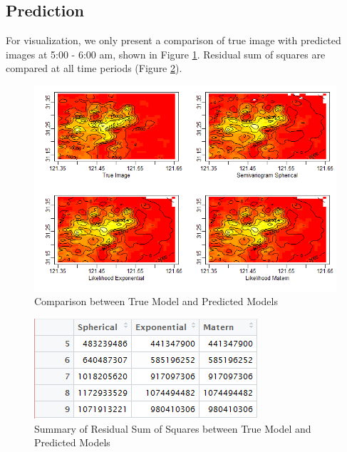 \documentclass[hidelinks,12pt]{article}
\begin{document}
	\subsection{Prediction}
	For visualization, we only present a comparison of true image with predicted images at 5:00 - 6:00 am, shown in Figure \ref{fig:pred5}. Residual sum of squares are compared at all time periods (Figure \ref{fig:predsum}).
	\begin{figure}[!ht]
		\includegraphics[width=\textwidth]{prediction_at_5.png}
		\caption{Comparison between True Model and Predicted Models \label{fig:pred5}}
	\end{figure}
	\begin{figure}[!ht]
		\includegraphics[width=\textwidth]{pred_result_total.png}
		\caption{Summary of Residual Sum of Squares between True Model and Predicted Models \label{fig:predsum}}
	\end{figure}
\end{document}
